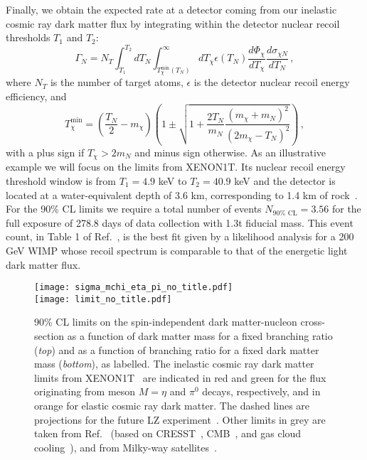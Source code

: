 Finally, we obtain the expected rate at a detector coming from our inelastic cosmic ray dark matter flux by integrating within the detector nuclear recoil thresholds $T_1$ and $T_2$:
%
\begin{equation}
\Gamma_N = N_T \int_{T_1}^{T_2} dT_N \int_{T_\chi^{\mathrm{min}}(T_N)}^\infty dT_\chi \epsilon(T_N) \frac{d\Phi_\chi}{dT_\chi} \frac{d\sigma_{\chi N}}{dT_N} \, ,
\end{equation}
%
where $N_T$ is the number of target atoms, $\epsilon$ is the detector nuclear recoil energy efficiency, and
%
\begin{equation}
T_\chi^{\mathrm{min}} = \left(\frac{T_N}{2} - m_\chi \right)\left(1 \pm \sqrt{1 + \frac{2T_N}{m_N}\frac{(m_\chi + m_N)^2}{(2m_\chi - T_N)^2}} \right) \, ,
\end{equation}
%
with a plus sign if $T_\chi > 2m_N$ and minus sign otherwise. As an illustrative example we will focus on the limits from XENON1T. Its nuclear recoil energy threshold window is from $T_1 = 4.9$ keV to $T_2 = 40.9$ keV and the detector is located at a water-equivalent depth of 3.6 km, corresponding to 1.4 km of rock~\cite{Aprile:2018dbl}. For the 90\% CL limits we require a total number of events $N_{90\% \text{ CL}} = 3.56$ for the full exposure of 278.8 days of data collection with 1.3t fiducial mass. This event count, in Table 1 of Ref.~\cite{Aprile:2018dbl}, is the best fit given by a likelihood analysis for a 200 GeV WIMP whose recoil spectrum is comparable to that of the energetic light dark matter flux. 

\begin{figure}
\begin{center}
\texttt{[image: sigma\_mchi\_eta\_pi\_no\_title.pdf]} \\
\hspace{-0.25cm}\texttt{[image: limit\_no\_title.pdf]}
\end{center}
\caption{90\% CL limits on the spin-independent dark matter-nucleon cross-section as a function of dark matter mass for a fixed branching ratio (\textit{top}) and as a function of branching ratio for a fixed dark matter mass (\textit{bottom}), as labelled. The inelastic cosmic ray dark matter limits from XENON1T~\cite{Aprile:2018dbl} are indicated in red and green for the flux originating from meson $M=\eta$ and $\pi^0$ decays, respectively, and in orange for elastic cosmic ray dark matter. The dashed lines are projections for the future LZ experiment~\cite{Akerib:2018lyp}. Other limits in grey are taken from Ref.~\cite{Bringmann:2018cvk} (based on CRESST~\cite{Angloher:2017sxg}, CMB~\cite{Xu:2018efh}, and gas cloud cooling~\cite{Bhoonah:2018wmw}), and from Milky-way satellites~\cite{Nadler:2019zrb}. 
\label{fig:limits}}
\end{figure}


